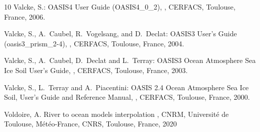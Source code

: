 \begin{thebibliography}{10}
Valcke, S.:
\newblock OASIS4 User Guide (OASIS4\_0\_2),
,
\newblock CERFACS, Toulouse, France, 2006.

Valcke, S., A.~Caubel, R.~Vogelsang, and D.~Declat:
\newblock OASIS3 User's Guide (oasis3\_prism\_2-4),
,
\newblock CERFACS, Toulouse, France, 2004.

Valcke, S., A.~Caubel, D.~Declat and L.~Terray:
\newblock OASIS3 Ocean Atmosphere Sea Ice Soil User's Guide,
,
\newblock CERFACS, Toulouse, France, 2003.

Valcke, S., L.~Terray and A.~Piacentini:
\newblock OASIS 2.4 Ocean Atmosphere Sea Ice Soil, User's Guide and
Reference Manual,
,
\newblock CERFACS, Toulouse, France, 2000.

Voldoire, A. 
\newblock River to ocean models interpolation
,
\newblock CNRM, Universit{\'e} de Toulouse, M{\'e}t{\'e}o-France,
CNRS, Toulouse, France, 2020

\end{thebibliography}
